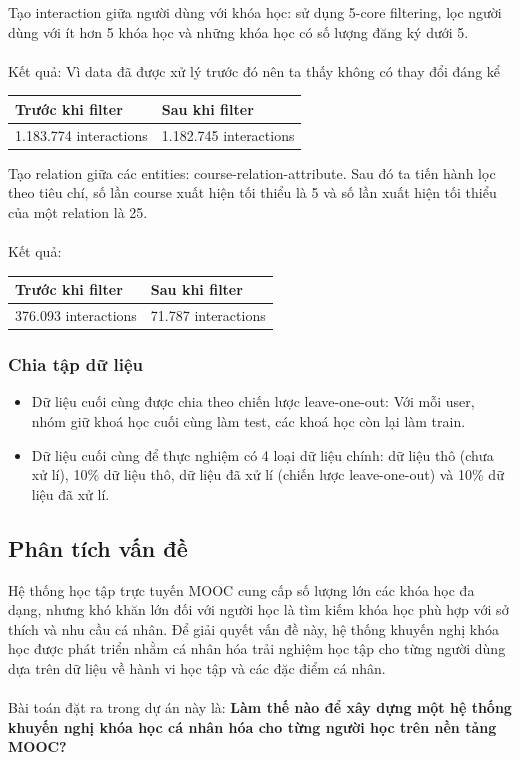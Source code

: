Tạo interaction giữa người dùng với khóa học: sử dụng 5-core filtering, lọc người dùng với ít hơn 5 khóa học và những khóa học có số lượng đăng ký dưới 5.\\
\\
Kết quả: Vì data đã được xử lý trước đó nên ta thấy không có thay đổi đáng kể
\begin{center}
\begin{tabular}{|| m{15em}  m{15em}||} 
 \hline
 Trước khi filter & Sau khi filter\\ [0.5ex] 
 \hline\hline
 1.183.774 interactions & 1.182.745 interactions \\ [1ex]
 \hline
\end{tabular}
\end{center}
\newpage
Tạo relation giữa các entities: course-relation-attribute. Sau đó ta tiến hành lọc theo tiêu chí, số lần course xuất hiện tối thiểu là 5 và số lần xuất hiện tối thiểu của một relation là 25. \\
\\
Kết quả: 
\begin{center}
\begin{tabular}{|| m{15em}  m{15em}||} 
 \hline
 Trước khi filter & Sau khi filter\\ [0.5ex] 
 \hline\hline
 376.093 interactions & 71.787 interactions \\ [1ex]
 \hline
\end{tabular}
\end{center}
\subsubsection{Chia tập dữ liệu}
\begin{itemize}
    \item Dữ liệu cuối cùng được chia theo chiến lược leave-one-out: Với mỗi user, nhóm giữ khoá học cuối cùng làm test, các khoá học còn lại làm train. 
    \item Dữ liệu cuối cùng để thực nghiệm có 4 loại dữ liệu chính: dữ liệu thô (chưa xử lí), 10\% dữ liệu thô, dữ liệu đã xử lí (chiến lược leave-one-out) và 10\% dữ liệu đã xử lí.
\end{itemize}

\subsection{Phân tích vấn đề}
Hệ thống học tập trực tuyến MOOC cung cấp số lượng lớn các khóa học đa dạng, nhưng khó khăn lớn đối với người học là tìm kiếm khóa học phù hợp với sở thích và nhu cầu cá nhân. Để giải quyết vấn đề này, hệ thống khuyến nghị khóa học được phát triển nhằm cá nhân hóa trải nghiệm học tập cho từng người dùng dựa trên dữ liệu về hành vi học tập và các đặc điểm cá nhân.\\
\\
Bài toán đặt ra trong dự án này là: \textbf{Làm thế nào để xây dựng một hệ thống khuyến nghị khóa học cá nhân hóa cho từng người học trên nền tảng MOOC?}
